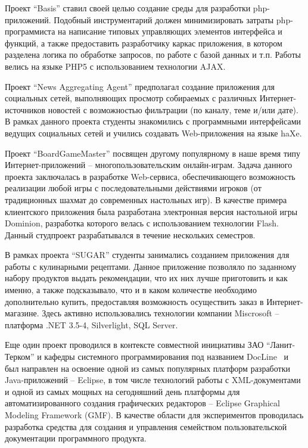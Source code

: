 \documentclass[a4paper]{article}
\begin{document}
Проект ``Basis'' ставил своей целью создание среды для разработки php-приложений. Подобный инструментарий должен минимизировать затраты php-программиста на написание типовых управляющих элементов интерфейса и функций, а также предоставить разработчику каркас приложения, в котором разделена логика по обработке запросов, по работе с базой данных и т.п. Работы велись на языке PHP5 с использованием технологии AJAX.

Проект ``News Aggregating Agent'' предполагал создание приложения для социальных сетей, выполняющих просмотр собираемых с различных Интернет-источников новостей с возможностью фильтрации (по каналу, теме и/или дате). В рамках данного проекта студенты знакомились с программными интерфейсами ведущих социальных сетей и учились создавать Web-приложения на языке haXe.

Проект ``BoardGameMaster'' посвящен другому популярному в наше время типу Интернет-приложений -- многопользовательским онлайн-играм. Задача данного проекта заключалась в разработке Web-сервиса, обеспечивающего возможность реализации любой игры с последовательными действиями игроков (от традиционных шахмат до современных настольных игр). В качестве примера клиентского приложения была разработана электронная версия настольной игры Dominion, разработка которого велась с использованием технологии Flash. Данный студпроект разрабатывался  в течение нескольких семестров.

В рамках проекта ``SUGAR'' студенты занимались созданием приложения для работы с кулинарными рецептами. Данное приложение позволяло по заданному набору продуктов выдать рекомендации, что их них лучше приготовить и как именно, а также подсказывало, что и в каком количестве необходимо дополнительно купить, предоставляя возможность осуществить заказ в Интернет-магазине. Здесь активно использовались технологии компании Miscrosoft -- платформа .NET 3.5-4, Silverlight, SQL Server.

Еще один проект проводился в контексте совместной инициативы ЗАО ``Ланит-Терком'' и кафедры системного программирования под названием DocLine~\cite{docLine1, docLine3, docLine2} и был направлен на освоение одной из самых популярных платформ разработки Java-приложений -- Eclipse, в том числе технологий работы с XML-документами и одной из самых мощных на сегодняшний день платформы для автоматизированного создания графических редакторов -- Eclipse Graphical Modeling Framework (GMF). В качестве области для экспериментов проводилась разработка средства для создания и управления семейством пользовательской документации программного продукта. 
 
\end{document}
